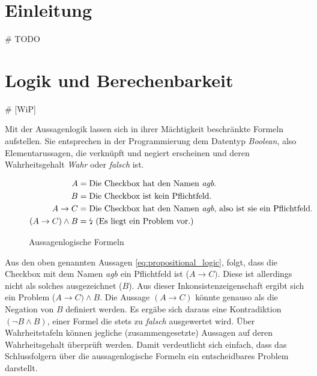 \documentclass[runningheads,a4paper]{llncs}
\begin{document}
\section{Einleitung}
\# TODO
\newpage
\section{Logik und Berechenbarkeit}

\# [WiP]

Mit der Aussagenlogik lassen sich in ihrer Mächtigkeit beschränkte Formeln aufstellen. Sie entsprechen in der Programmierung dem Datentyp \textit{Boolean}, also Elementarussagen, die verknüpft und negiert erscheinen und deren Wahrheitsgehalt \textit{Wahr} oder \textit{falsch} ist.

\begin{figure}
\begin{align}
\begin{split}
A &= \textnormal{Die Checkbox hat den Namen \textit{agb}.}\\
B &= \textnormal{Die Checkbox ist kein Pflichtfeld.}\\
A \to C &= \textnormal{Die Checkbox hat den Namen \textit{agb}, also ist sie ein Pflichtfeld.}\\
(A \to C) \land B &= \textnormal{\lightning\ (Es liegt ein Problem vor.)}
\label{eq:propositional_logic}
\end{split}
\end{align}
\caption{Aussagenlogische Formeln}
\end{figure}
 
Aus den oben genannten Aussagen \eqref{eq:propositional_logic}, folgt, dass die Checkbox mit dem Namen \textit{agb} ein Pflichtfeld ist (\(A \to C)\). 
Diese ist allerdings nicht als solches ausgezeichnet (\(B\)). 
Aus dieser Inkonsistenzeigenschaft ergibt sich ein Problem (\(A \to C) \land B\). 
Die Aussage \((A \to C)\) könnte genauso als die Negation von \(B\) definiert werden. 
Es ergäbe sich daraus eine Kontradiktion \((\neg B \land B)\), einer Formel die stets zu \textit{falsch} ausgewertet wird. 
Über Wahrheitstafeln können jegliche (zusammengesetzte) Aussagen auf deren Wahrheitsgehalt überprüft werden. 
Damit verdeutlicht sich einfach, dass das Schlussfolgern über die aussagenlogische Formeln ein entscheidbares Problem darstellt.
\\
\end{document}
